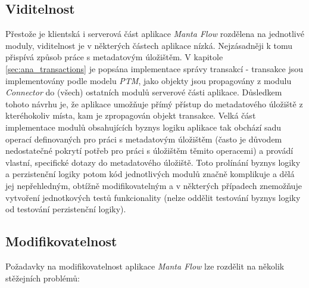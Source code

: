 \subsection{Viditelnost}
\label{sec:ana_visibility}
Přestože je klientská i serverová část aplikace \textit{Manta Flow} rozdělena na jednotlivé moduly, viditelnost je v některých částech aplikace nízká. Nejzásadněji k tomu přispívá způsob práce s metadatovým úložištěm. V kapitole \ref{sec:ana_transactions} je popsána implementace správy transakcí - transakce jsou implementovány podle modelu \textit{PTM}, jako objekty jsou propagovány z modulu \textit{Connector} do (všech) ostatních modulů serverové části aplikace. Důsledkem tohoto návrhu je, že aplikace umožňuje přímý přístup do metadatového úložiště z kteréhokoliv místa, kam je zpropagován objekt transakce. Velká část implementace modulů obsahujících byznys logiku aplikace tak obchází sadu operací definovaných pro práci s metadatovým úložištěm (často je důvodem nedostatečné pokrytí potřeb pro práci s úložištěm těmito operacemi) a provádí vlastní, specifické dotazy do metadatového úložiště. Toto prolínání byznys logiky a perzistenční logiky potom kód jednotlivých modulů značně komplikuje a dělá jej nepřehledným, obtížně modifikovatelným a v některých případech znemožňuje vytvoření jednotkových testů funkcionality (nelze oddělit testování byznys logiky od testování perzistenční logiky).


\subsection{Modifikovatelnost}
\label{sec:ana_modularity}
Požadavky na modifikovatelnost aplikace \textit{Manta Flow} lze rozdělit na několik stěžejních problémů:


